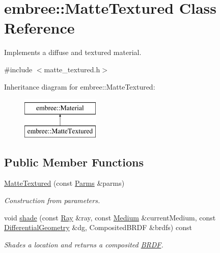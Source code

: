 \hypertarget{classembree_1_1_matte_textured}{
\section{embree::MatteTextured Class Reference}
\label{classembree_1_1_matte_textured}
}


Implements a diffuse and textured material.  




{\ttfamily \#include $<$matte\_\-textured.h$>$}

Inheritance diagram for embree::MatteTextured:\begin{figure}[H]
\begin{center}
\leavevmode
\includegraphics[height=2.000000cm]{classembree_1_1_matte_textured}
\end{center}
\end{figure}
\subsection*{Public Member Functions}
\begin{DoxyCompactItemize}
\item 
\hyperlink{classembree_1_1_matte_textured_a18bf13a11c39fe4a01a70ad3e30b9cb7}{MatteTextured} (const \hyperlink{classembree_1_1_parms}{Parms} \&parms)
\begin{DoxyCompactList}\small\item\em Construction from parameters. \item\end{DoxyCompactList}\item 
\hypertarget{classembree_1_1_matte_textured_a300cb0b2a429dfa509baf860e96d4efb}{
void \hyperlink{classembree_1_1_matte_textured_a300cb0b2a429dfa509baf860e96d4efb}{shade} (const \hyperlink{structembree_1_1_ray}{Ray} \&ray, const \hyperlink{classembree_1_1_medium}{Medium} \&currentMedium, const \hyperlink{structembree_1_1_differential_geometry}{DifferentialGeometry} \&dg, CompositedBRDF \&brdfs) const }
\label{classembree_1_1_matte_textured_a300cb0b2a429dfa509baf860e96d4efb}

\begin{DoxyCompactList}\small\item\em Shades a location and returns a composited \hyperlink{classembree_1_1_b_r_d_f}{BRDF}. \item\end{DoxyCompactList}\end{DoxyCompactItemize}


